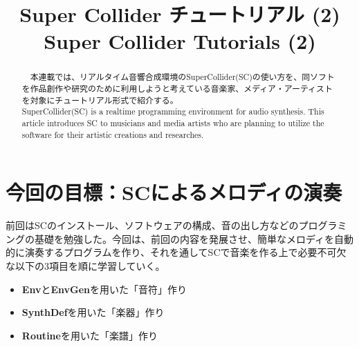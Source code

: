 \documentclass{jsarticle}
\title{Super Collider チュートリアル (2)\\ 
Super Collider Tutorials (2)
}
\begin{document}
\makeatletter 
\def\ps@myheadings{%
\let\ps@jpl@in\ps@plain%
\def\@evenhead{\reset@font\hfil\leftmark\hfil}%
\def\@oddhead{\reset@font\hfil\rightmark\hfil}%
\let\@mkboth\@gobbletwo%
\let\sectionmark\@gobble%
\let\subsectionmark\@gobble%
% 
\def\@oddfoot{\reset@font\hfil-- \thepage --\hfil}%
\let\@evenfoot\@oddfoot 
} 
\makeatother 


\setcounter{page}{ 9 } 
\pagestyle{myheadings} 




\maketitle
\thispagestyle{myheadings}

%
\begin{abstract}
　本連載では、リアルタイム音響合成環境のSuperCollider(SC)の使い方を、同ソフトを作品創作や研究のために利用しようと考えている音楽家、メディア・アーティストを対象にチュートリアル形式で紹介する。\\
SuperCollider(SC) is a realtime programming environment for audio synthesis. This article introduces SC to musicians and media artists who are planning to utilize the software for their artistic creations and researches.

\end{abstract}
%
\section{今回の目標：SCによるメロディの演奏}
前回はSC\cite{scsite}のインストール、ソフトウェアの構成、音の出し方などのプログラミングの基礎を勉強した。今回は、前回の内容を発展させ、簡単なメロディを自動的に演奏するプログラムを作り、それを通してSCで音楽を作る上で必要不可欠な以下の3項目を順に学習していく。

\begin{itemize}
 \item {\bf Env}と{\bf EnvGen}を用いた「音符」作り
 \item {\bf SynthDef}を用いた「楽器」作り
 \item {\bf Routine}を用いた「楽譜」作り
\end{itemize}
\end{document}
